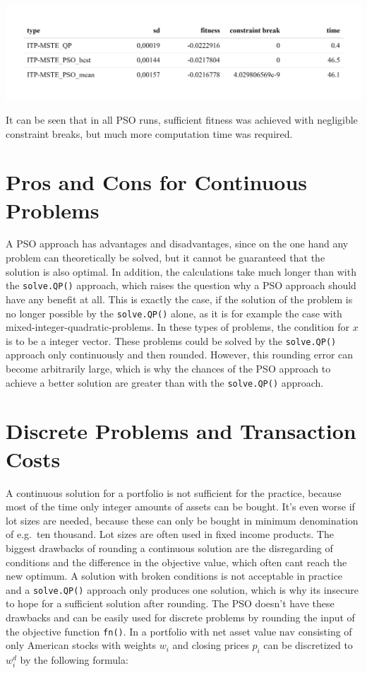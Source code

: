\documentclass[
  oneside]{book}
\begin{document}
\includegraphics{Master_Thesis_files/figure-latex/pso8-1.png}

It can be seen that in all PSO runs, sufficient fitness was achieved with negligible constraint breaks, but much more computation time was required.

\hypertarget{pros-and-cons-for-continuous-problems}{%
\section{Pros and Cons for Continuous Problems}\label{pros-and-cons-for-continuous-problems}}

A PSO approach has advantages and disadvantages, since on the one hand any problem can theoretically be solved, but it cannot be guaranteed that the solution is also optimal. In addition, the calculations take much longer than with the \texttt{solve.QP()} approach, which raises the question why a PSO approach should have any benefit at all. This is exactly the case, if the solution of the problem is no longer possible by the \texttt{solve.QP()} alone, as it is for example the case with mixed-integer-quadratic-problems. In these types of problems, the condition for \(x\) is to be a integer vector. These problems could be solved by the \texttt{solve.QP()} approach only continuously and then rounded. However, this rounding error can become arbitrarily large, which is why the chances of the PSO approach to achieve a better solution are greater than with the \texttt{solve.QP()} approach.

\hypertarget{discrete-problems-and-transaction-costs}{%
\section{Discrete Problems and Transaction Costs}\label{discrete-problems-and-transaction-costs}}

A continuous solution for a portfolio is not sufficient for the practice, because most of the time only integer amounts of assets can be bought. It's even worse if lot sizes are needed, because these can only be bought in minimum denomination of e.g.~ten thousand. Lot sizes are often used in fixed income products. The biggest drawbacks of rounding a continuous solution are the disregarding of conditions and the difference in the objective value, which often cant reach the new optimum. A solution with broken conditions is not acceptable in practice and a \texttt{solve.QP()} approach only produces one solution, which is why its insecure to hope for a sufficient solution after rounding. The PSO doesn't have these drawbacks and can be easily used for discrete problems by rounding the input of the objective function \texttt{fn()}. In a portfolio with net asset value \(\text{nav}\) consisting of only American stocks with weights \(w_i\) and closing prices \(p_i\) can be discretized to \(w_i^d\) by the following formula:
\end{document}
